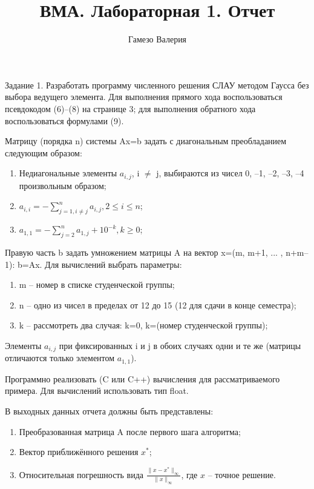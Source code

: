 \documentclass[a4paper, 12pt]{article}
\begin{document}
\author{Гамезо Валерия}
\title{ВМА. Лабораторная 1. Отчет}
\date{}
\maketitle

Задание 1.
Разработать программу численного решения СЛАУ методом Гаусса без выбора ведущего элемента. Для выполнения прямого хода воспользоваться псевдокодом (6)–(8) на странице 3; для выполнения обратного хода воспользоваться формулами (9).

Матрицу (порядка n) системы Ax=b задать с диагональным преобладанием следующим образом:

\begin{enumerate}
	\item Недиагональные элементы \(a_{i, j}\), i \(\neq\) j, выбираются из чисел 0, –1, –2, –3, –4 произвольным образом;
	\item \(a_{i, i} = -\sum\limits_{j = 1, i \neq j}^{n}a_{i, j}, 2 \leq i \leq n\);
	\item \(a_{1, 1} = -\sum\limits_{j = 2}^{n}a_{1, j} + 10^{-k}, k \geq 0 \);
\end{enumerate}

Правую часть b задать умножением матрицы A на вектор x=(m, m+1, ... , n+m–1): b=Ax.
Для вычислений выбрать параметры:

\begin{enumerate}
	\item m – номер в списке студенческой группы;
	\item n – одно из чисел в пределах от 12 до 15 (12 для сдачи в конце семестра);
	\item k – рассмотреть два случая: k=0, k=(номер студенческой группы);
\end{enumerate}

Элементы \(a_{i, j}\) при фиксированных i и j в обоих случаях одни и те же (матрицы отличаются только элементом \(a_{1, 1}\)).

Программно реализовать (C или C++) вычисления для рассматриваемого примера. Для вычислений использовать тип float.

В выходных данных отчета должны быть представлены:

\begin{enumerate}
	\item Преобразованная матрица A после первого шага алгоритма;
	\item Вектор приближённого решения \(x^*\);
	\item Относительная погрешность вида $\frac{\|x - x^*\|_{\infty}}{\|x\|_{\infty}}$, где \(x\) – точное решение.
\end{enumerate}
\end{document}

